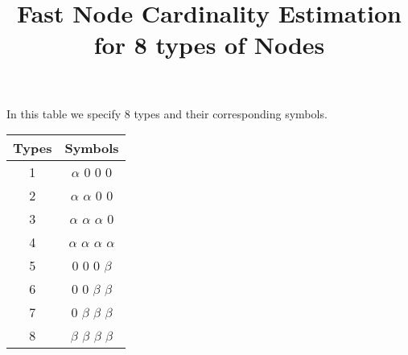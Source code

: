 \documentclass[fleqn]{article}
\begin{document}
\title{Fast Node Cardinality Estimation for 8 types of Nodes}

\maketitle{}

In this table we specify 8 types and their corresponding symbols. 
\begin{center}
  \begin{tabular}{| c | c |}
    \hline
    Types & Symbols \\ \hline
    1 & $\alpha$ $0$ $0$ $0$ \\ \hline
    2 & $\alpha$ $\alpha$ $0$ $0$ \\ \hline
    3 & $\alpha$ $\alpha$ $\alpha$ $0$ \\ \hline
    4 & $\alpha$ $\alpha$ $\alpha$ $\alpha$ \\ \hline
    5 & $0$ $0$ $0$ $\beta$ \\ \hline
    6 & $0$ $0$ $\beta$ $\beta$ \\ \hline
    7 & $0$ $\beta$ $\beta$ $\beta$ \\ \hline
    8 & $\beta$ $\beta$ $\beta$ $\beta$ \\ \hline
    
    \hline
  \end{tabular}
\end{center}
\end{document}
